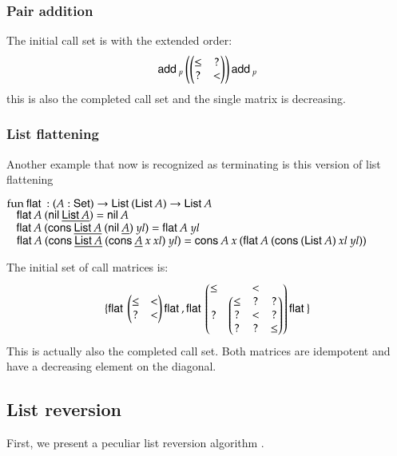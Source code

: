 \subsubsection{Pair addition}

The initial call set is with the extended order:
\[
\mathsf{add}\:_p\begin{pmatrix}
\begin{pmatrix}
\leq & ? \\
?    & < \\
\end{pmatrix}
\end{pmatrix}\mathsf{add}\:_p
\]
this is also the completed call set and the single matrix is decreasing.

\subsubsection{List flattening}
Another example that now is recognized as terminating is this version of list flattening
\begin{bsp}
$\mathrm{fun}\: \mathsf{flat}\: : (A : \mathsf{Set} ) \rightarrow \mathsf{List}\: (\mathsf{List}\: A) \rightarrow \mathsf{List}\: A$\\
$\hspace*{3mm} \mathsf{flat}\: A \: (\mathsf{nil}\: \underline{\mathsf{List}\: A}) = \mathsf{nil}\: A $\\
$\hspace*{3mm} \mathsf{flat}\: A \: (\mathsf{cons}\: \underline{\mathsf{List}\: A} \: (\mathsf{nil}\: \underline{A}) \: yl) = \mathsf{flat}\: A \: yl $\\
$\hspace*{3mm} \mathsf{flat}\: A \: (\mathsf{cons}\: \underline{\mathsf{List}\: A} \: (\mathsf{cons}\: \underline{A} \: x \: xl) \: yl)  = \mathsf{cons}\: A \: x \: (\mathsf{flat}\: A \: (\mathsf{cons}\: (\mathsf{List}\: A) \: xl \: yl))$
\end{bsp}
\noindent The initial set of call matrices is:
\[
\{
\mathsf{flat}\: \begin{pmatrix}
\leq & < \\
?    & < 
\end{pmatrix}\mathsf{flat}\:
, 
\mathsf{flat}\: \begin{pmatrix}
\leq & < \\
?    & 
\begin{pmatrix}
\leq &  ?  & ? \\
?    &  <  & ? \\
?    &  ?  & \leq 
\end{pmatrix}
\end{pmatrix}\mathsf{flat}\:
\}
\] 
This is actually also the completed call set.
Both matrices are idempotent and have a decreasing element on the diagonal.


\subsection{List reversion}
First, we present a peculiar list reversion algorithm \cite{blanqui04typebased}.

